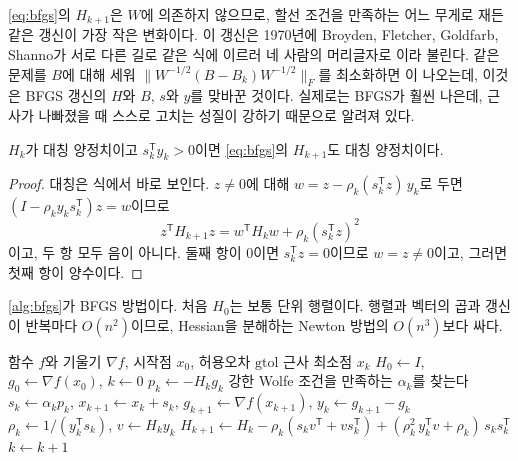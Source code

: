 \eqref{eq:bfgs}의 $H_{k+1}$은 $W$에 의존하지 않으므로, 할선 조건을 만족하는 어느 무게로 재든 같은 갱신이 가장 작은 변화이다. 이 갱신은 1970년에 Broyden, Fletcher, Goldfarb, Shanno가 서로 다른 길로 같은 식에 이르러 네 사람의 머리글자로 이라 불린다\cite{broyden1970,fletcher1970,goldfarb1970,shanno1970}. 같은 문제를 $B$에 대해 세워 $\|W^{-1/2}(B-B_k)W^{-1/2}\|_F$를 최소화하면 이 나오는데, 이것은 BFGS 갱신의 $H$와 $B$, $s$와 $y$를 맞바꾼 것이다. 실제로는 BFGS가 훨씬 나은데, 근사가 나빠졌을 때 스스로 고치는 성질이 강하기 때문으로 알려져 있다\cite{nocedal2006}.

\begin{proposition}
\label{prop:bfgs-pd}
$H_k$가 대칭 양정치이고 $s_k^{\mathsf T}y_k>0$이면 \eqref{eq:bfgs}의 $H_{k+1}$도 대칭 양정치이다.
\end{proposition}

\begin{proof}
대칭은 식에서 바로 보인다. $z\ne0$에 대해 $w=z-\rho_k(s_k^{\mathsf T}z)\,y_k$로 두면 $(I-\rho_ky_ks_k^{\mathsf T})z=w$이므로
\[
z^{\mathsf T}H_{k+1}z=w^{\mathsf T}H_kw+\rho_k(s_k^{\mathsf T}z)^2
\]
이고, 두 항 모두 음이 아니다. 둘째 항이 $0$이면 $s_k^{\mathsf T}z=0$이므로 $w=z\ne0$이고, 그러면 첫째 항이 양수이다.
\end{proof}

\cref{alg:bfgs}가 BFGS 방법이다. 처음 $H_0$는 보통 단위 행렬이다. 행렬과 벡터의 곱과 갱신이 반복마다 $O(n^2)$이므로, Hessian을 분해하는 Newton 방법의 $O(n^3)$보다 싸다.

\begin{algorithm}[t]
\begin{algorithmic}[1]
\Require 함수 $f$와 기울기 $\nabla f$, 시작점 $x_0$, 허용오차 $\mathrm{gtol}$
\Ensure 근사 최소점 $x_k$
\State $H_0\gets I$, $g_0\gets\nabla f(x_0)$, $k\gets0$
  \State $p_k\gets-H_kg_k$
  \State 강한 Wolfe 조건을 만족하는 $\alpha_k$를 찾는다 
  \State $s_k\gets\alpha_kp_k$, $x_{k+1}\gets x_k+s_k$, $g_{k+1}\gets\nabla f(x_{k+1})$, $y_k\gets g_{k+1}-g_k$
  \State $\rho_k\gets1/(y_k^{\mathsf T}s_k)$, $v\gets H_ky_k$
  \State $H_{k+1}\gets H_k-\rho_k(s_kv^{\mathsf T}+vs_k^{\mathsf T})+(\rho_k^2\,y_k^{\mathsf T}v+\rho_k)\,s_ks_k^{\mathsf T}$ 
  \State $k\gets k+1$
\EndWhile
\end{algorithmic}
\caption{BFGS 방법}
\label{alg:bfgs}
\end{algorithm}

